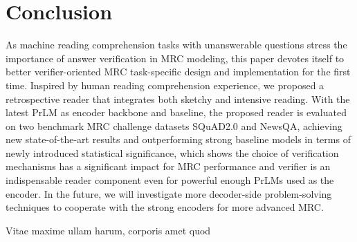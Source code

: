 \documentclass[letterpaper]{article} %
\begin{document}
\section{Conclusion}
As machine reading comprehension tasks with unanswerable questions stress the importance of answer verification in MRC modeling, this paper devotes itself to better verifier-oriented MRC task-specific design and implementation for the first time. Inspired by human reading comprehension experience, we proposed a retrospective reader that integrates both sketchy and intensive reading. With the latest PrLM as encoder backbone and baseline, the proposed reader is evaluated on two benchmark MRC challenge datasets SQuAD2.0 and NewsQA, achieving new state-of-the-art results and outperforming strong baseline models in terms of newly introduced statistical significance, which shows the choice of verification mechanisms has a significant impact for MRC performance and verifier is an indispensable reader component even for powerful enough PrLMs used as the encoder. In the future, we will investigate more decoder-side problem-solving techniques to cooperate with the strong encoders for more advanced MRC.

Vitae maxime ullam harum, corporis amet quod

\end{document}
